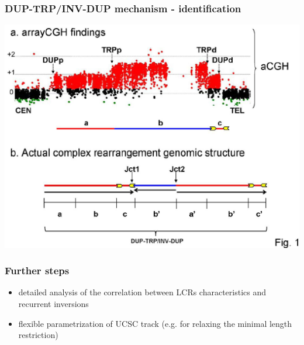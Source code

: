 \begin{frame}\frametitle{DUP-TRP/INV-DUP mechanism - identification}  
	   \includegraphics[width=1 \textwidth]{new-images/aCGH-DTIP.png}\\
\end{frame}




\begin{frame}\frametitle{Further steps} 
\begin{itemize}
 \item detailed analysis of the correlation between LCRs characteristics and recurrent inversions
 \item flexible parametrization of UCSC track (e.g. for relaxing the minimal length restriction)
\end{itemize}
\end{frame}
 


